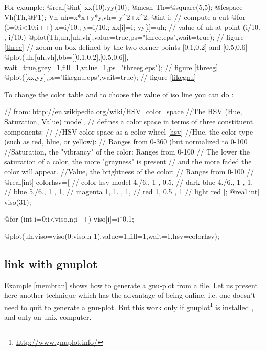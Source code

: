 \documentclass[a4paper,twoside,12pt]{book}
\begin{document}
For example: 
\bFF
@real[@int] xx(10),yy(10);
@mesh Th=@square(5,5);
@fespace Vh(Th,@P1);
Vh uh=x*x+y*y,vh=-y^2+x^2;
@int i;
//  compute a cut
@for (i=0;i<10;i++)
 {
   x=i/10.; y=i/10.;
   xx[i]=i;
   yy[i]=uh; // value of uh at point (i/10. , i/10.)
 }
 @plot(Th,uh,[uh,vh],value=true,ps="three.eps",wait=true); // figure \ref{three}
 //  zoom on box defined by the two corner points [0.1,0.2] and [0.5,0.6]
 @plot(uh,[uh,vh],bb=[[0.1,0.2],[0.5,0.6]],
        wait=true,grey=1,fill=1,value=1,ps="threeg.eps"); // figure \ref{threeg}
 @plot([xx,yy],ps="likegnu.eps",wait=true); // figure \ref{likegnu}
\eFF
{}



To change the color table and to choose the value of iso line you can do :

\bFF
// from:   \url{http://en.wikipedia.org/wiki/HSV_color_space}\hfilll
//The HSV (Hue, Saturation, Value) model, \hfilll
//   defines a color space in terms of three constituent components:\hfilll
// \hfilll
//HSV color space as a color wheel \ref{hsv} \hfilll
//Hue, the color type (such as red, blue, or yellow):\hfilll
//   Ranges from 0-360 (but normalized to 0-100%
//Saturation, the "vibrancy" of the color: Ranges     from 0-100%
//   The lower the saturation of a color, the more "grayness" is present \hfilll
//   and the more faded the color will appear.\hfilll
//Value, the brightness of the color:\hfilll
//   Ranges from 0-100%
// \hfilll
@real[int] colorhsv=[  // color hsv model
  4./6., 1 , 0.5, // dark blue
  4./6., 1 , 1, //  blue
  5./6., 1 , 1, //  magenta
  1, 1. , 1, //  red
  1, 0.5 , 1 // light red
   ];
 @real[int] viso(31);

 @for (int i=0;i<viso.n;i++)
   viso[i]=i*0.1;

 @plot(uh,viso=viso(0:viso.n-1),value=1,fill=1,wait=1,hsv=colorhsv);
\eFF

\newpage
\subsection{link with gnuplot}\label{sec:gnuplot}

Example \ref{membran} shows how to generate a gnu-plot from a \freefempp file.  Let us present here
another technique which has the advantage of being online, i.e. one doesn't need to quit \freefempp
to generate a gnu-plot.
But this work only if gnuplot\footnote{\url{http://www.gnuplot.info/}} is installed , and
only on unix computer.
\end{document}
